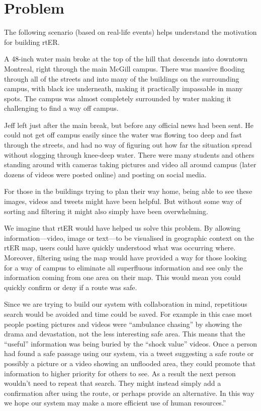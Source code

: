 \section{Problem}
The following scenario (based on real-life events) helps understand the motivation for building rtER.

\begin{munquote}
A 48-inch water main broke at the top of the hill that descends into downtown Montreal, right through the main McGill campus. There was massive flooding through all of the streets and into many of the buildings on the surrounding campus, with black ice underneath, making it practically impassable in many spots. The campus was almost completely surrounded by water making it challenging to find a way off campus.

Jeff left just after the main break, but before any official news had been sent. He could not get off campus easily since the water was flowing too deep and fast through the streets, and had no way of figuring out how far the situation spread without slogging through knee-deep water. There were many students and others standing around with cameras taking pictures and video all around campus (later dozens of videos were posted online) and posting on social media.

For those in the buildings trying to plan their way home, being able to see these images, videos and tweets might have been helpful. But without some way of sorting and filtering it might also simply have been overwhelming.

We imagine that rtER would have helped us solve this problem. By allowing information---video, image or text---to be visualised in geographic context on the rtER map, users could have quickly understood what was occurring where. Moreover, filtering using the map would have provided a way for those looking for a way of campus to eliminate all superfluous information and see only the information coming from one area on their map. This would mean you could quickly confirm or deny if a route was safe.

Since we are trying to build our system with collaboration in mind, repetitious search would be avoided and time could be saved. For example in this case most people posting pictures and videos were ``ambulance chasing'' by showing the drama and devastation, not the less interesting safe area. This means that the ``useful'' information was being buried by the ``shock value'' videos. Once a person had found a safe passage using our system, via a tweet suggesting a safe route or possibly a picture or a video showing an unflooded area, they could promote that information to higher priority for others to see. As a result the next person wouldn't need to repeat that search. They might instead simply add a confirmation after using the route, or perhaps provide an alternative. In this way we hope our system may make a more efficient use of human resources.”
\end{munquote}



